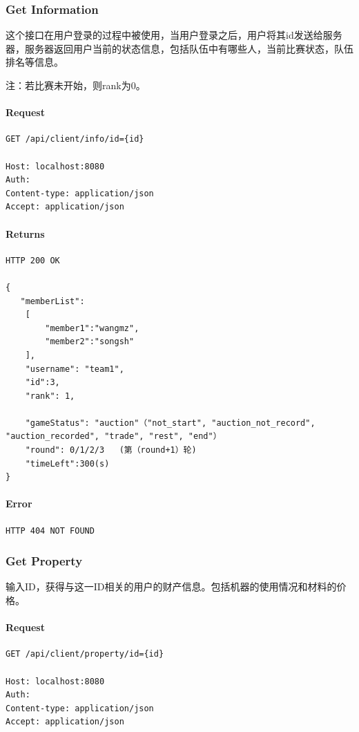 \documentclass{article}
\begin{document}
\subsubsection{Get Information}
这个接口在用户登录的过程中被使用，当用户登录之后，用户将其id发送给服务器，服务器返回用户当前的状态信息，包括队伍中有哪些人，当前比赛状态，队伍排名等信息。

注：若比赛未开始，则rank为0。

\paragraph*{Request}
\begin{lstlisting}
GET /api/client/info/id={id}

Host: localhost:8080
Auth:
Content-type: application/json
Accept: application/json
\end{lstlisting}
\paragraph*{Returns}
\begin{lstlisting}
HTTP 200 OK

{
   "memberList":
    [
        "member1":"wangmz",
    	"member2":"songsh"
    ],
    "username": "team1",
    "id":3,
    "rank": 1,

    "gameStatus": "auction"（"not_start", "auction_not_record", "auction_recorded", "trade", "rest", "end"）
    "round": 0/1/2/3   (第（round+1）轮)
    "timeLeft":300(s)
}
\end{lstlisting}
\paragraph*{Error}
\begin{lstlisting}
HTTP 404 NOT FOUND
\end{lstlisting}

\subsubsection{Get Property}
输入ID，获得与这一ID相关的用户的财产信息。包括机器的使用情况和材料的价格。
\paragraph*{Request}
\begin{lstlisting}
GET /api/client/property/id={id}

Host: localhost:8080
Auth:
Content-type: application/json
Accept: application/json
\end{lstlisting}
\end{document}
